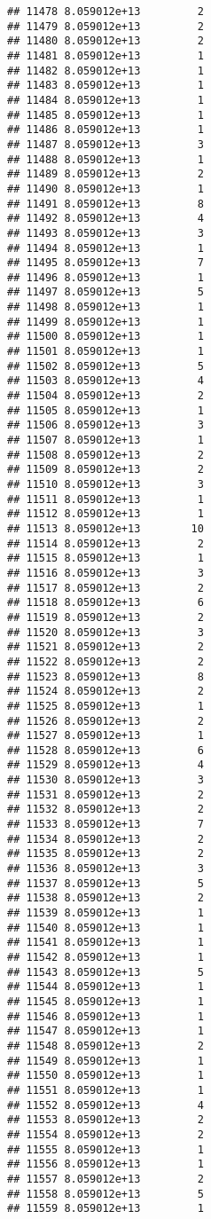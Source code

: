 \documentclass[
]{article}
\begin{document}
\begin{verbatim}
## 11478 8.059012e+13         2
## 11479 8.059012e+13         2
## 11480 8.059012e+13         2
## 11481 8.059012e+13         1
## 11482 8.059012e+13         1
## 11483 8.059012e+13         1
## 11484 8.059012e+13         1
## 11485 8.059012e+13         1
## 11486 8.059012e+13         1
## 11487 8.059012e+13         3
## 11488 8.059012e+13         1
## 11489 8.059012e+13         2
## 11490 8.059012e+13         1
## 11491 8.059012e+13         8
## 11492 8.059012e+13         4
## 11493 8.059012e+13         3
## 11494 8.059012e+13         1
## 11495 8.059012e+13         7
## 11496 8.059012e+13         1
## 11497 8.059012e+13         5
## 11498 8.059012e+13         1
## 11499 8.059012e+13         1
## 11500 8.059012e+13         1
## 11501 8.059012e+13         1
## 11502 8.059012e+13         5
## 11503 8.059012e+13         4
## 11504 8.059012e+13         2
## 11505 8.059012e+13         1
## 11506 8.059012e+13         3
## 11507 8.059012e+13         1
## 11508 8.059012e+13         2
## 11509 8.059012e+13         2
## 11510 8.059012e+13         3
## 11511 8.059012e+13         1
## 11512 8.059012e+13         1
## 11513 8.059012e+13        10
## 11514 8.059012e+13         2
## 11515 8.059012e+13         1
## 11516 8.059012e+13         3
## 11517 8.059012e+13         2
## 11518 8.059012e+13         6
## 11519 8.059012e+13         2
## 11520 8.059012e+13         3
## 11521 8.059012e+13         2
## 11522 8.059012e+13         2
## 11523 8.059012e+13         8
## 11524 8.059012e+13         2
## 11525 8.059012e+13         1
## 11526 8.059012e+13         2
## 11527 8.059012e+13         1
## 11528 8.059012e+13         6
## 11529 8.059012e+13         4
## 11530 8.059012e+13         3
## 11531 8.059012e+13         2
## 11532 8.059012e+13         2
## 11533 8.059012e+13         7
## 11534 8.059012e+13         2
## 11535 8.059012e+13         2
## 11536 8.059012e+13         3
## 11537 8.059012e+13         5
## 11538 8.059012e+13         2
## 11539 8.059012e+13         1
## 11540 8.059012e+13         1
## 11541 8.059012e+13         1
## 11542 8.059012e+13         1
## 11543 8.059012e+13         5
## 11544 8.059012e+13         1
## 11545 8.059012e+13         1
## 11546 8.059012e+13         1
## 11547 8.059012e+13         1
## 11548 8.059012e+13         2
## 11549 8.059012e+13         1
## 11550 8.059012e+13         1
## 11551 8.059012e+13         1
## 11552 8.059012e+13         4
## 11553 8.059012e+13         2
## 11554 8.059012e+13         2
## 11555 8.059012e+13         1
## 11556 8.059012e+13         1
## 11557 8.059012e+13         2
## 11558 8.059012e+13         5
## 11559 8.059012e+13         1

\end{verbatim}
\end{document}

